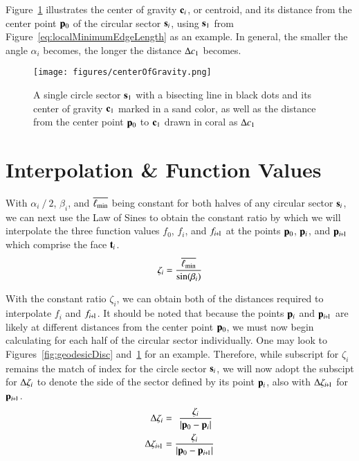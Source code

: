 Figure~\ref{fig:centerOfGravity} illustrates the center of gravity $\mathbf{c}_i$, or centroid,  and its distance from the center point $\mathbf{p}_0$ of the circular sector $\mathbf{s}_i$, using $\mathbf{s}_1$ from Figure~\ref{eq:localMinimumEdgeLength} as an example. In general, the smaller the angle $\alpha_i$ becomes, the longer the distance $\Delta c_1$ becomes.
\begin{figure}[ht]
\ffigbox
	{\texttt{[image: figures/centerOfGravity.png]}}
	{\caption[Distance to the Center of Gravity]{A single circle sector $\mathbf{s}_1$ with a bisecting line in black dots and its center of gravity $\mathbf{c}_1$ marked in a sand color, as well as the distance from the center point $\mathbf{p}_0$ to $\mathbf{c}_1$ drawn in coral as $\Delta c_1$}\label{fig:centerOfGravity}}
\end{figure}%
%
%
%
%
%
%
%
\section{Interpolation \& Function Values}
\label{ch4sIFV}
With $\alpha_i\mathbin{/}2$, $\beta_i$, and $\overline{\ell_\text{min}}$ being constant for both halves of any circular sector $\mathbf{s}_i$, we can next use the Law of Sines to obtain the constant ratio by which we will interpolate the three function values $f_0$, $f_i$, and $f_{\sipo}$ at the points $\mathbf{p}_0$, $\mathbf{p}_i$, and $\bp_{\sipo}$ which comprise the face $\mathbf{t}_i$.
\begin{equation}
	\zeta_i = \frac{\overline{\ell_\text{min}}}{\sin(\beta_i)}
	\label{eq:zeta}
\end{equation}%
%

With the constant ratio $\zeta_i$, we can obtain both of the distances required to interpolate $f_i$ and $f_{\sipo}$. It should be noted that because the points $\mathbf{p}_i$ and $\bp_{\sipo}$ are likely at different distances from the center point $\mathbf{p}_0$, we must now begin calculating for each half of the circular sector individually. One may look to Figures~\ref{fig:geodesicDisc} and~\ref{fig:centerOfGravity} for an example. Therefore, while subscript for $\zeta_i$ remains the match of index for the circle sector $\mathbf{s}_i$, we will now adopt the subscipt for $\Delta\zeta_i$ to denote the side of the sector defined by its point $\mathbf{p}_i$, also with $\Dz_{\sipo}$ for $\bp_{\sipo}$.
\begin{align}
	\Dz_i & = \kern4pt\frac{\zeta_i}{|\bp_0 - \bp_i|}
	\label{eq:distanceIForInterpolation}\\
	\Dz_{\sipo} & = \frac{\zeta_i}{|\bp_0 - \bp_{\sipo}|}
	\label{eq:distanceIp1ForInterpolation}
\end{align}%
%

